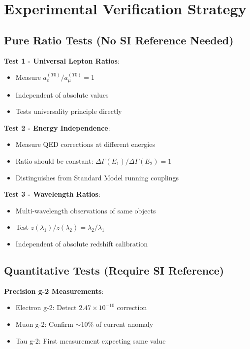 \documentclass[12pt,a4paper]{article}
\theoremstyle{definition}
\theoremstyle{remark}
\begin{document}
	\section{Experimental Verification Strategy}
	
	\subsection{Pure Ratio Tests (No SI Reference Needed)}
	
	\textbf{Test 1 - Universal Lepton Ratios}:
	\begin{itemize}
		\item Measure $a_e^{(T0)}/a_{\mu}^{(T0)} = 1$
		\item Independent of absolute values
		\item Tests universality principle directly
	\end{itemize}
	
	\textbf{Test 2 - Energy Independence}:
	\begin{itemize}
		\item Measure QED corrections at different energies
		\item Ratio should be constant: $\Delta\Gamma(E_1)/\Delta\Gamma(E_2) = 1$
		\item Distinguishes from Standard Model running couplings
	\end{itemize}
	
	\textbf{Test 3 - Wavelength Ratios}:
	\begin{itemize}
		\item Multi-wavelength observations of same objects
		\item Test $z(\lambda_1)/z(\lambda_2) = \lambda_2/\lambda_1$
		\item Independent of absolute redshift calibration
	\end{itemize}
	
	\subsection{Quantitative Tests (Require SI Reference)}
	
	\textbf{Precision g-2 Measurements}:
	\begin{itemize}
		\item Electron g-2: Detect $2.47 \times 10^{-10}$ correction
		\item Muon g-2: Confirm $\sim 10\%$ of current anomaly
		\item Tau g-2: First measurement expecting same value
	\end{itemize}
	
\end{document}
